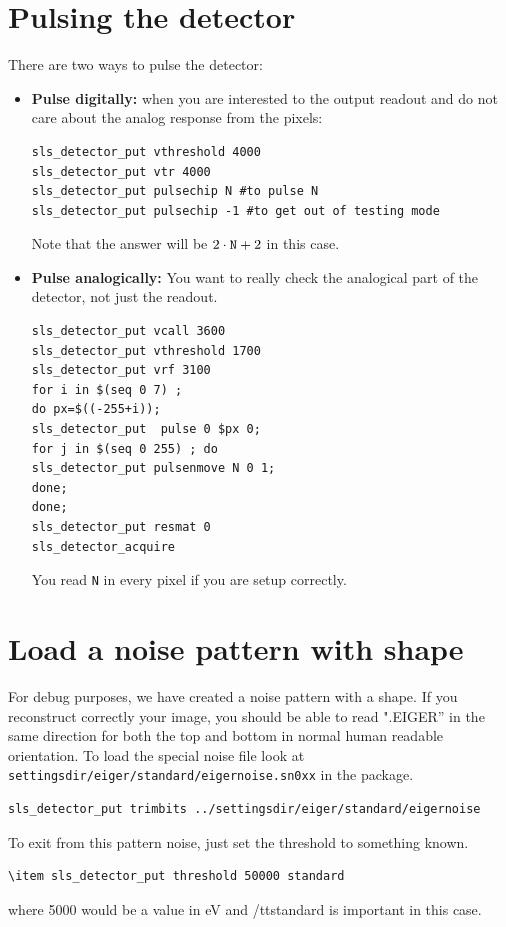 \documentclass{article}
\begin{document}
\section{Pulsing the detector}
There are two ways to pulse the detector: 
\begin{itemize}
\item \textbf{Pulse digitally:} when you are interested to the output readout and do not care about the analog response from the pixels:
 \begin{verbatim}
sls_detector_put vthreshold 4000
sls_detector_put vtr 4000
sls_detector_put pulsechip N #to pulse N
sls_detector_put pulsechip -1 #to get out of testing mode 
\end{verbatim}
Note that the answer will be $2 \cdot \textrm{{\tt{N}}} +2$ in this case.

\item  \textbf{Pulse analogically:} You want to really check the analogical part of the detector, not just the readout.

 \begin{verbatim}
sls_detector_put vcall 3600
sls_detector_put vthreshold 1700
sls_detector_put vrf 3100
for i in $(seq 0 7) ; 
do px=$((-255+i)); 
sls_detector_put  pulse 0 $px 0;
for j in $(seq 0 255) ; do
sls_detector_put pulsenmove N 0 1;
done;
done;
sls_detector_put resmat 0
sls_detector_acquire
\end{verbatim}
You read {\tt{N}} in every pixel if you are setup correctly. 
\end{itemize}
 
\section{Load a noise pattern with shape}
For debug purposes, we have created a noise pattern with a shape. If you reconstruct correctly your image, you should be able to read ".EIGER'' in the same direction for both the top and bottom in normal human readable orientation.
To load the special noise file look at {\tt{settingsdir/eiger/standard/eigernoise.sn0xx}} in the package. 
\begin{verbatim}
sls_detector_put trimbits ../settingsdir/eiger/standard/eigernoise
\end{verbatim}
To exit from this pattern noise, just set the threshold to something known. 
\begin{verbatim}
\item sls_detector_put threshold 50000 standard
\end{verbatim}
where 5000 would be a value in eV and {/tt{standard}} is important in this case.
\end{document}
